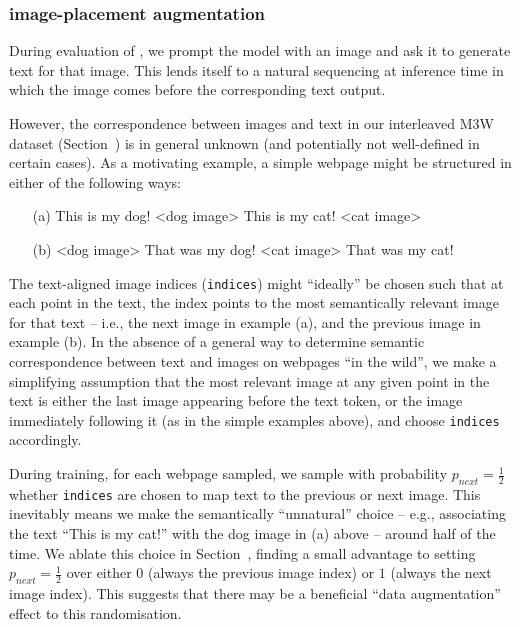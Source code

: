 \subsubsection{\mmmw{} image-placement augmentation}
\label{app:m3w_processing}
\label{app:interleaved_indices}

During evaluation of \methodfamily{}, we prompt the model with an image and ask it to generate text for that image.
This lends itself to a natural sequencing at inference time in which the image comes before the corresponding text output.

However, the correspondence between images and text in our interleaved M3W dataset (Section~) is in general unknown (and potentially not well-defined in certain cases).
As a motivating example, a simple webpage might be structured in either of the following ways:
\begin{enumerate}
    \item[(a)] This is my dog! <dog image> \hspace{1cm} This is my cat! <cat image>
    \item[(b)] <dog image> That was my dog! \hspace{1cm} <cat image> That was my cat!
\end{enumerate}
The text-aligned image indices (\texttt{indices}) might ``ideally'' be chosen such that at each point in the text, the index points to the most semantically relevant image for that text -- i.e., the next image in example (a), and the previous image in example (b).
In the absence of a general way to determine semantic correspondence between text and images on webpages ``in the wild'', we make a simplifying assumption that the most relevant image at any given point in the text is either the last image appearing before the text token, or the image immediately following it (as in the simple examples above), and choose \texttt{indices} accordingly.

During training, for each webpage sampled, we sample with probability $p_{next} = \frac{1}{2}$ whether \texttt{indices} are chosen to map text to the previous or next image.
This inevitably means we make the semantically ``unnatural'' choice -- e.g., associating the text ``This is my cat!'' with the dog image in (a) above -- around half of the time.
We ablate this choice in Section~, finding a small advantage to setting $p_{next} = \frac{1}{2}$ over either $0$ (always  the previous image index) or $1$ (always the next image index).
This suggests that there may be a beneficial ``data augmentation'' effect to this randomisation.



